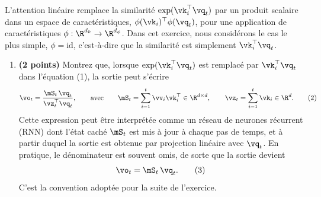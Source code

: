 \documentclass[12pt]{article}
\theoremstyle{definition}
\begin{document}
L'attention linéaire remplace la similarité $\exp(\vk_i^\top \vq_t)$ par un produit scalaire dans un espace de caractéristiques, $\phi(\vk_i)^\top\phi(\vq_t)$, pour une application de caractéristiques $\phi:\R^{d_k}\to\R^{d_\phi}$. Dans cet exercice, nous considérons le cas le plus simple, $\phi=\mathrm{id}$, c'est-à-dire que la similarité est simplement $\vk_i^\top \vq_t$.

\begin{enumerate}
\item \textbf{(2 points)} Montrez que, lorsque $\exp(\vk_i^\top \vq_t)$ est remplacé par $\vk_i^\top \vq_t$ dans l'équation (1), la sortie peut s'écrire
\begin{equation}
 \vo_t=\frac{\mS_t\,\vq_t}{\vz_t^\top \vq_t},\qquad\text{avec}\qquad \mS_t=\sum_{i=1}^t \vv_i \vk_i^\top\in\R^{d\times d},\qquad \vz_t=\sum_{i=1}^t \vk_i\in\R^d.
\tag{2}
\end{equation}
Cette expression peut être interprétée comme un réseau de neurones récurrent (RNN) dont l'état caché $\mS_t$ est mis à jour à chaque pas de temps, et à partir duquel la sortie est obtenue par projection linéaire avec $\vq_t$. En pratique, le dénominateur est souvent omis, de sorte que la sortie devient
\begin{equation}\vo_t=\mS_t\,\vq_t.\tag{3}\end{equation}
C'est la convention adoptée pour la suite de l'exercice.
\end{enumerate}
\end{document}
